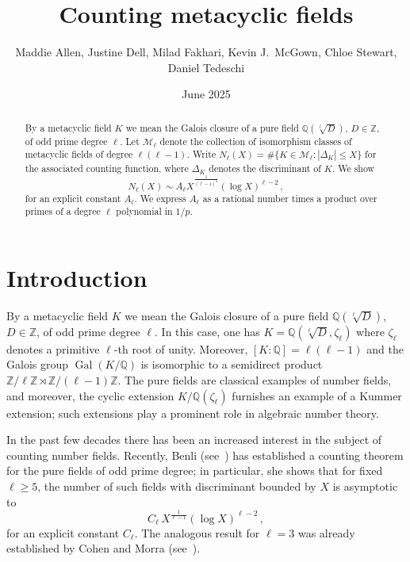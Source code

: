 \documentclass[12pt]{amsart}
\title{Counting metacyclic fields}
\author[M. Allen, J. Dell, M. Fakhari, K. J. McGown, C. Stewart, D. Tedeschi]{Maddie Allen, Justine Dell, Milad Fakhari, Kevin J.~McGown, Chloe Stewart, Daniel Tedeschi}
\date{June 2025}
\newcommand{\ma}[1]{{\color{purple}{MA: #1}} }
\def\Z{\mathbb{Z}}
\def\Q{\mathbb{Q}}
\DeclareMathOperator{\Gal}{Gal}
\begin{document}
\begin{abstract}
By a metacyclic field $K$ we mean the Galois closure of a pure field
$\Q(\sqrt[\ell]{D})$, $D\in\Z$, of odd prime degree $\ell$.
Let $\mathcal{M}_\ell$ denote the collection of
isomorphism classes of metacyclic fields of degree $\ell(\ell-1)$.
Write $N_\ell(X)=\#\{K\in\mathcal{M}_\ell: |\Delta_K|\leq X\}$
for the associated counting function,
where $\Delta_K$ denotes the discriminant of $K$.
We show
$$
  N_\ell(X)\sim A_\ell X^{\frac{1}{(\ell-1)^2}}(\log X)^{\ell-2}
  \,,
$$
for an explicit constant $A_\ell$.  We express $A_\ell$ as a rational number
times a product over primes of a degree $\ell$ polynomial in $1/p$.
\end{abstract}


\maketitle


\section{Introduction}\label{Intro}

By a metacyclic field $K$ we mean the Galois closure of a pure field
$\Q(\sqrt[\ell]{D})$, $D\in\Z$, of odd prime degree $\ell$.
In this case, one has
$K=\Q(\sqrt[\ell]{D},\zeta_\ell)$ where $\zeta_\ell$ denotes a primitive $\ell$-th
root of unity.  Moreover, $[K:\Q]=\ell(\ell-1)$ and the Galois group $\Gal(K/\Q)$
is isomorphic to a semidirect product
$\Z/\ell\Z\rtimes \Z/(\ell-1)\Z$.
The pure fields are classical examples of number fields, and
moreover, the cyclic extension $K/\Q(\zeta_\ell)$ furnishes an example of a
Kummer extension; such extensions play a prominent role in algebraic number theory.

In the past few decades there has been an increased interest in the subject of counting number fields.
Recently, Benli (see~\cite{Benli}) has established a counting
theorem for the pure fields of odd prime degree;
in particular, she shows that for fixed $\ell\geq 5$,
the number of such fields with discriminant bounded by $X$
is asymptotic to
$$C_\ell\, X^{\frac{1}{\ell-1}}(\log X)^{\ell-2}\,,$$
for an explicit constant $C_\ell$.
The analogous result for $\ell=3$ was already established by Cohen and Morra (see~\cite{CM}).
\end{document}
